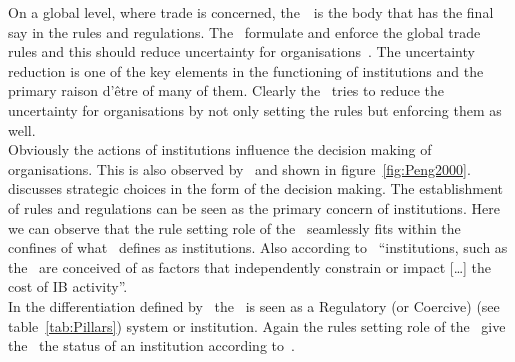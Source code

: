 On a global level, where trade is concerned, the~\wto~is the body that has the final say in the rules and regulations. 
The \wto~formulate and enforce the global trade rules and this should reduce uncertainty for organisations~\citep{Peng:2002ef}.
The uncertainty reduction is one of the key elements in the functioning of institutions and the primary raison d'être of many of them.
Clearly the \wto~tries to reduce the uncertainty for organisations by not only setting the rules but enforcing them as well.\\
Obviously the actions of institutions influence the decision making of organisations. 
This is also observed by~\cite{Peng:2002ef} and shown in figure~\ref{fig:Peng2000}. 
\cite{Peng:2000ut} discusses strategic choices in the form of the decision making.
The establishment of rules and regulations can be seen as the primary concern of institutions. 
Here we can observe that the rule setting role of the \wto~seamlessly fits within the confines of what~\cite{Hotho:2012uu} defines as institutions. 
Also according to~\citep{Hotho:2012uu,Jackson:2008cz} ``institutions, such as the \wto~are conceived of as factors that independently constrain or impact [\ldots] the cost of \gls{IB} activity''.\\
In the differentiation defined by~\cite{Scott:2001tt} the \wto~is seen as a Regulatory (or Coercive) (see table~\ref{tab:Pillars}) system or institution. 
Again the rules setting role of the \wto~give the \wto~the status of an institution according to~\cite{Scott:2001tt}.

